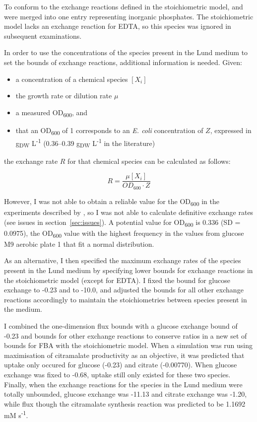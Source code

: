 \documentclass[parskip=full, numbers=noenddot]{scrreprt}
\begin{document}
To conform to the exchange reactions defined in the stoichiometric model,  and  were merged into one entry representing inorganic phosphates. The stoichiometric model lacks an exchange reaction for EDTA, so this species was ignored in subsequent examinations.

In order to use the concentrations of the species present in the Lund medium to set the bounds of exchange reactions, additional information is needed. Given:

\begin{itemize}
\item a concentration of a chemical species $[X_{i}]$
\item the growth rate or dilution rate $\mu$
\item a measured OD\textsubscript{600}, and
\item that an OD\textsubscript{600} of 1 corresponds to an \emph{E. coli} concentration of $Z$, expressed in g\textsubscript{DW} L\textsuperscript{-1} (0.36--0.39 g\textsubscript{DW} L\textsuperscript{-1} in the literature)
\end{itemize}
  
the exchange rate $R$ for that chemical species can be calculated as follows:

\[
  R = \frac{\mu[X_{i}]}{OD_{600} \cdot Z}
\]

However, I was not able to obtain a reliable value for the OD\textsubscript{600} in the experiments described by \citet{orth_comprehensive_2011}, so I was not able to calculate definitive exchange rates (see issues in section~\ref{sec:issues}). A potential value for OD\textsubscript{600} is 0.336 (SD = 0.0975), the OD\textsubscript{600} value with the highest frequency in the values from glucose M9 aerobic plate 1 \citep{orth_comprehensive_2011} that fit a normal distribution.

As an alternative, I then specified the maximum exchange rates of the species present in the Lund medium by specifying lower bounds for exchange reactions in the stoichiometric model (except for EDTA).
I fixed the bound for glucose exchange to -0.23 and to -10.0, and adjusted the bounds for all other exchange reactions accordingly to maintain the stoichiometries between species present in the medium.

I combined the one-dimension flux bounds with a glucose exchange bound of -0.23 and bounds for other exchange reactions to conserve ratios in a new set of bounds for FBA with the stoichiometric model. When a simulation was run using maximisation of citramalate productivity as an objective, it was predicted that uptake only occured for glucose (-0.23) and citrate (-0.00770). When glucose exchange was fixed to -0.68, uptake still only existed for these two species. Finally, when the exchange reactions for the species in the Lund medium were totally unbounded, glucose exchange was -11.13 and citrate exchange was -1.20, while flux though the citramalate synthesis reaction was predicted to be 1.1692 mM s\textsuperscript{-1}.
\end{document}
